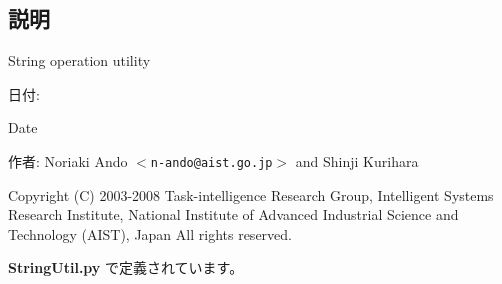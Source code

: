 \subsection{説明}
String operation utility 

\begin{Desc}
\item[日付:]\end{Desc}
\begin{Desc}
\item[Date]\end{Desc}
\begin{Desc}
\item[作者:]Noriaki Ando $<${\tt n-ando@aist.go.jp}$>$ and Shinji Kurihara\end{Desc}
Copyright (C) 2003-2008 Task-intelligence Research Group, Intelligent Systems Research Institute, National Institute of Advanced Industrial Science and Technology (AIST), Japan All rights reserved. 

 {\bf StringUtil.py} で定義されています。